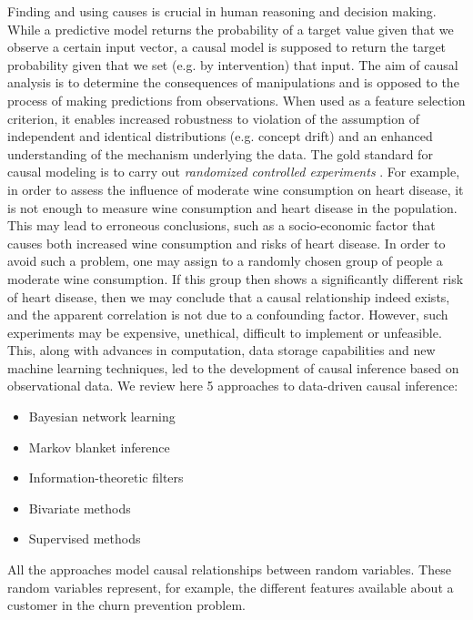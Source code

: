 Finding and using causes is crucial in human reasoning and decision making.
While a predictive model returns the probability of a target value given that we
observe a certain input vector, a causal model is supposed to return the target
probability given that we set (e.g. by intervention) that input. The aim of
causal analysis is to determine the consequences of manipulations and is opposed
to the process of making predictions from observations. When used as a feature
selection criterion, it enables increased robustness to violation of the
assumption of independent and identical distributions (e.g. concept drift)
\parencite{guyon2007causal} and an enhanced understanding of the mechanism
underlying the data. The gold standard for causal modeling is to carry out
\emph{randomized controlled experiments} \parencite{fisher1937design}. For
example, in order to assess the influence of moderate wine consumption on heart
disease, it is not enough to measure wine consumption and heart disease in the
population. This may lead to erroneous conclusions, such as a socio-economic
factor that causes both increased wine consumption and risks of heart disease.
In order to avoid such a problem, one may assign to a randomly chosen group of
people a moderate wine consumption. If this group then shows a significantly
different risk of heart disease, then we may conclude that a causal relationship
indeed exists, and the apparent correlation is not due to a confounding factor.
However, such experiments may be expensive, unethical, difficult to implement or
unfeasible. This, along with advances in computation, data storage capabilities
and new machine learning techniques, led to the development of causal inference
based on observational data. We review here 5 approaches to data-driven causal
inference:

\begin{itemize}
    \item Bayesian network learning
    \item Markov blanket inference
    \item Information-theoretic filters
    \item Bivariate methods
    \item Supervised methods
\end{itemize}

All the approaches model causal relationships between random variables. These
random variables represent, for example, the different features available about
a customer in the churn prevention problem.

